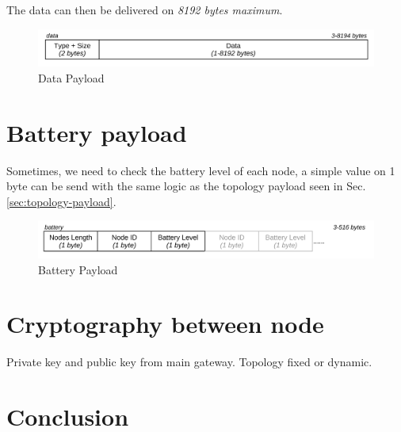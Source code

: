 \documentclass[
	a4paper,
	10pt,
	unnumberedsections,
	twoside,
]{LTJournalArticle}
\begin{document}
The data can then be delivered on \textit{8192 bytes maximum}.

\begin{figure}[H]
    \centering
    \includegraphics[width=1\linewidth]{img/data.png}
    \caption{Data Payload}
    \label{fig:data}
\end{figure}

\section{Battery payload} \label{sec:battery-payload}
Sometimes, we need to check the battery level of each node, a simple value on 1 byte can be send with the same logic as the topology payload seen in Sec.\ref{sec:topology-payload}.
\begin{figure}[H]
    \centering
    \includegraphics[width=1\linewidth]{img/battery.png}
    \caption{Battery Payload}
    \label{fig:battery}
\end{figure}

\section{Cryptography between node} \label{subsec:node-crypto}
Private key and public key from main gateway. Topology fixed or dynamic.

\section{Conclusion}

\nocite{*}
\printbibliography
\end{document}
